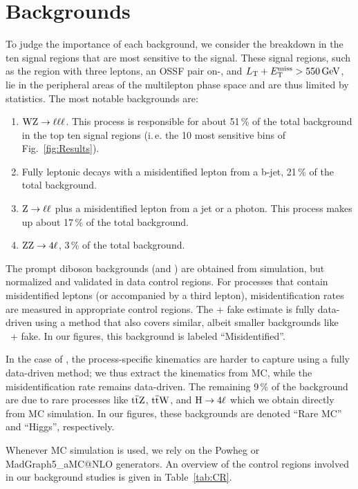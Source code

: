 \chapter{Backgrounds}
\label{chap:Backgrounds}

To judge the importance of each background, we consider the breakdown in the ten signal regions that are most sensitive to the signal. These signal regions, such as the region with three leptons, an OSSF pair on-\Z, and $L_\textrm{T} + E_{\mathrm{T}}^{\text{miss}} > 550\,\text{Ge\hspace{-.08em}V}$, lie in the peripheral areas of the multilepton phase space and are thus limited by statistics. The most notable backgrounds are:
\begin{enumerate}
	\item $\mathrm{W}\mathrm{Z} \to \ell\ell\ell$. This process is responsible for about 51\,\% of the total background in the top ten signal regions (i.\,e. the 10 most sensitive bins of Fig.~\ref{fig:Results}).
	\item Fully leptonic \ttbar decays with a misidentified lepton from a b-jet, 21\,\% of the total background.
	\item $\mathrm{Z} \to \ell\ell$ plus a misidentified lepton from a jet or a photon. This process makes up about 17\,\% of the total background.
	\item $\mathrm{Z}\mathrm{Z} \to 4\ell$, 3\,\% of the total background.
\end{enumerate}

The prompt diboson backgrounds (\WZ and \ZZ) are obtained from simulation, but normalized and validated in data control regions. For processes that contain misidentified leptons (\Z or \ttbar accompanied by a third lepton), misidentification rates are measured in appropriate control regions. The \Z + fake estimate is fully data-driven using a method that also covers similar, albeit smaller backgrounds like \PW\PW\ + fake. In our figures, this background is labeled ``Misidentified''.

In the case of \ttbar, the process-specific kinematics are harder to capture using a fully data-driven method; we thus extract the kinematics from MC, while the misidentification rate remains data-driven. The remaining 9\,\% of the background are due to rare processes like $\mathrm{t}\overline{\mathrm{t}}\mathrm{Z}$, $\mathrm{t}\overline{\mathrm{t}}\mathrm{W}$, and $\mathrm{H} \to 4\ell$ which we obtain directly from MC simulation. In our figures, these backgrounds are denoted ``Rare MC'' and ``Higgs'', respectively.

Whenever MC simulation is used, we rely on the Powheg or MadGraph5\_aMC@NLO generators. An overview of the control regions involved in our background studies is given in Table~\ref{tab:CR}.

